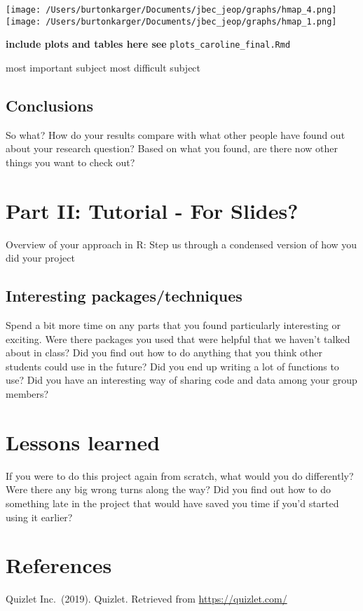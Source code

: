 \documentclass[]{article}
\begin{document}
\texttt{[image: /Users/burtonkarger/Documents/jbec\_jeop/graphs/hmap\_4.png]}
\texttt{[image: /Users/burtonkarger/Documents/jbec\_jeop/graphs/hmap\_1.png]}

\textbf{include plots and tables here see}
\texttt{plots\_caroline\_final.Rmd}

most important subject most difficult subject

\hypertarget{conclusions}{%
\subsection{Conclusions}\label{conclusions}}

So what? How do your results compare with what other people have found
out about your research question? Based on what you found, are there now
other things you want to check out?

\hypertarget{part-ii-tutorial---for-slides}{%
\section{Part II: Tutorial - For
Slides?}\label{part-ii-tutorial---for-slides}}

Overview of your approach in R: Step us through a condensed version of
how you did your project

\hypertarget{interesting-packagestechniques}{%
\subsection{Interesting
packages/techniques}\label{interesting-packagestechniques}}

Spend a bit more time on any parts that you found particularly
interesting or exciting. Were there packages you used that were helpful
that we haven't talked about in class? Did you find out how to do
anything that you think other students could use in the future? Did you
end up writing a lot of functions to use? Did you have an interesting
way of sharing code and data among your group members?

\hypertarget{lessons-learned}{%
\section{Lessons learned}\label{lessons-learned}}

If you were to do this project again from scratch, what would you do
differently? Were there any big wrong turns along the way? Did you find
out how to do something late in the project that would have saved you
time if you'd started using it earlier?

\hypertarget{references}{%
\section{References}\label{references}}

Quizlet Inc.~(2019). Quizlet. Retrieved from \url{https://quizlet.com/}
\end{document}
